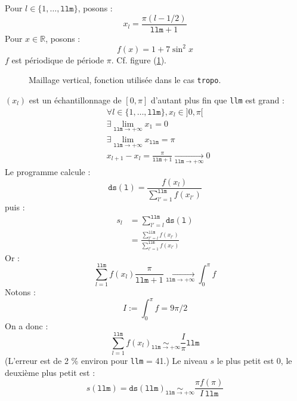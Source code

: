 \documentclass[a4paper,french]{article}
\begin{document}
Pour $l \in \{1, \dots,
\mathtt{llm}\}$, posons :
\begin{displaymath}
  x_l = \frac{\pi (l - 1/2)}{\mathtt{llm} + 1}
\end{displaymath}
Pour $x \in \mathbb{R}$, posons :
\begin{displaymath}
  f(x) = 1 + 7 \sin^2 x
\end{displaymath}
$f$ est périodique de période $\pi$. Cf. figure (\ref{fig:f_x}).
\begin{figure}[htbp]
  \centering
  
  \caption{Maillage vertical, fonction utilisée dans le cas
    \texttt{tropo}.}
  \label{fig:f_x}
\end{figure}
$(x_l)$ est un échantillonnage de $[0, \pi]$ d'autant plus fin que
\verb+llm+ est grand :
\begin{align*}
  & \forall l \in \{1, \dots, \mathtt{llm}\}, x_l \in ]0, \pi[ \\
  & \exists \lim_{\mathtt{llm} \to +\infty} x_1 = 0 \\
  & \exists \lim_{\mathtt{llm} \to +\infty} x_\mathtt{llm} = \pi \\
  & x_{l+1} - x_l = \frac{\pi}{\mathtt{llm} + 1}
  \underset{\mathtt{llm} \to + \infty}{\longrightarrow} 0
\end{align*}
Le programme calcule :
\begin{displaymath}
  \mathtt{ds(l)} = \frac{f(x_l)}{\sum_{l'=1}^\mathtt{llm} f(x_{l'})}
\end{displaymath}
puis :
\begin{align*}
  s_l & = \sum_{l' = l}^\mathtt{llm} \mathtt{ds(l)} \\
  & = \frac{\sum_{l' = l}^\mathtt{llm} f(x_{l'})}{\sum_{l'=1}^\mathtt{llm} f(x_{l'})}
\end{align*}
Or :
\begin{displaymath}
  \sum_{l=1}^\mathtt{llm} f(x_{l}) \frac{\pi}{\mathtt{llm} + 1}
  \underset{\mathtt{llm} \to + \infty}{\longrightarrow} \int_0 ^\pi f
\end{displaymath}
Notons :
\begin{displaymath}
  I := \int_0 ^\pi f = 9 \pi / 2
\end{displaymath}
On a donc :
\begin{displaymath}
  \sum_{l=1}^\mathtt{llm} f(x_{l})
  \underset{\mathtt{llm} \to +\infty}{\sim} \frac{I}{\pi} \mathtt{llm}
\end{displaymath}
(L'erreur est de 2 \% environ pour \verb+llm+ = 41.) Le niveau
$s$ le plus petit est 0, le deuxième plus petit est :
\begin{displaymath}
  s(\mathtt{llm}) = \mathtt{ds(llm)}
  \underset{\mathtt{llm} \to +\infty}{\sim} \frac{\pi f(\pi)}{I\ \mathtt{llm}}
\end{displaymath}
\end{document}
